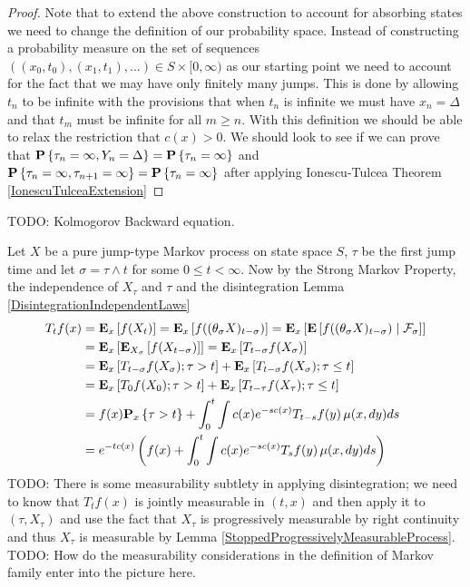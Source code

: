 \begin{proof}
Note that to extend the above construction to account for absorbing states we need to change the definition of our probability space.
Instead of constructing a probability measure on the set of sequences $((x_0, t_0), (x_1, t_1), \dotsc) \in S \times [0,\infty)$ as our starting point
we need to account for the fact that we may have only finitely many jumps.  This is done by allowing $t_n$ to be infinite with the provisions that
when $t_n$ is infinite we must have $x_n = \Delta$ and that $t_{m}$ must be infinite for all $m \geq n$.  With this definition we should be able to relax
the restriction that $c(x) > 0$.  We should look to see if we can prove that $\probability {\tau_n = \infty, Y_n = \Delta} = \probability{\tau_n = \infty}$ and
$\probability {\tau_n = \infty, \tau_{n+1} = \infty} =
\probability{\tau_n = \infty}$ after applying Ionescu-Tulcea Theorem \ref{IonescuTulceaExtension}
\end{proof}

TODO: Kolmogorov Backward equation.

Let $X$ be a pure jump-type Markov process on state space $S$, $\tau$
be the first jump time and let $\sigma = \tau \wedge t$ for some $0
\leq t < \infty$.  Now by the Strong Markov Property, the independence
of $X_\tau$ and $\tau$ and the disintegration Lemma \ref{DisintegrationIndependentLaws}
\begin{align*}
T_tf(x) 
&=\sexpectation{f(X_t)}{x} 
=\sexpectation{f((\theta_\sigma X)_{t - \sigma})}{x} 
=\sexpectation{\cexpectationlong{\mathcal{F}_\sigma}{f((\theta_\sigma  X)_{t - \sigma})}}{x} \\
&=\sexpectation{\sexpectation{f(X_{t - \sigma})}{X_\sigma}}{x} 
=\sexpectation{T_{t - \sigma}f(X_\sigma)}{x} \\
&=\sexpectation{T_{t - \sigma}f(X_\sigma) ; \tau > t}{x} +
  \sexpectation{T_{t - \sigma}f(X_\sigma); \tau \leq t}{x} \\
&= \sexpectation{T_{0}f(X_0) ; \tau > t}{x}  +
  \sexpectation{T_{t - \tau}f(X_\tau); \tau \leq t}{x} \\
&=f(x) \sprobability{\tau > t}{x} +  \int_0^t \int c(x) e^{-sc(x)} T_{t - s}f(y) \,  \mu(x, dy) ds \\
&=e^{-tc(x)}   \left( f(x) +  \int_0^t \int c(x) e^{-sc(x)} T_{s}f(y) \,  \mu(x, dy) ds \right )\\
\end{align*}
TODO: There is some measurability subtlety in applying disintegration; we need to know that $T_tf(x)$ is jointly measurable in $(t,x)$
and then apply it to $(\tau, X_\tau)$ and use the fact that $X_\tau$ is progressively measurable by right continuity and thus $X_\tau$ is measurable
by Lemma \ref{StoppedProgressivelyMeasurableProcess}.  TODO: How do the measurability considerations in the definition of Markov family enter into the picture here.

